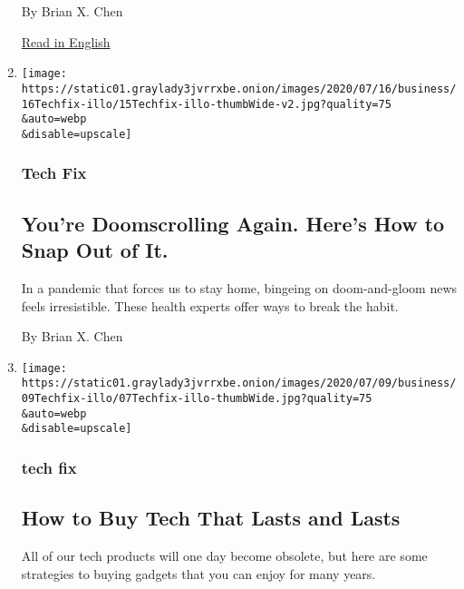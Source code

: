 \begin{enumerate}
  By Brian X. Chen

  \href{https://www.nytimes3xbfgragh.onion/2020/07/15/technology/personaltech/youre-doomscrolling-again-heres-how-to-snap-out-of-it.html}{Read
  in English}
\item
  \href{/2020/07/15/technology/personaltech/youre-doomscrolling-again-heres-how-to-snap-out-of-it.html}{}

  \texttt{[image: https://static01.graylady3jvrrxbe.onion/images/2020/07/16/business/16Techfix-illo/15Techfix-illo-thumbWide-v2.jpg?quality=75\\\&auto=webp\\\&disable=upscale]}

  \hypertarget{tech-fix-1}{%
  \subsubsection{Tech Fix}\label{tech-fix-1}}

  \hypertarget{youre-doomscrolling-again-heres-how-to-snap-out-of-it}{%
  \subsection{You're Doomscrolling Again. Here's How to Snap Out of
  It.}\label{youre-doomscrolling-again-heres-how-to-snap-out-of-it}}

  In a pandemic that forces us to stay home, bingeing on doom-and-gloom
  news feels irresistible. These health experts offer ways to break the
  habit.

  By Brian X. Chen
\item
  \href{/2020/07/08/technology/personaltech/tech-that-lasts.html}{}

  \texttt{[image: https://static01.graylady3jvrrxbe.onion/images/2020/07/09/business/09Techfix-illo/07Techfix-illo-thumbWide.jpg?quality=75\\\&auto=webp\\\&disable=upscale]}

  \hypertarget{tech-fix-2}{%
  \subsubsection{tech fix}\label{tech-fix-2}}

  \hypertarget{how-to-buy-tech-that-lasts-and-lasts}{%
  \subsection{How to Buy Tech That Lasts and
  Lasts}\label{how-to-buy-tech-that-lasts-and-lasts}}

  All of our tech products will one day become obsolete, but here are
  some strategies to buying gadgets that you can enjoy for many years.


\end{enumerate}
